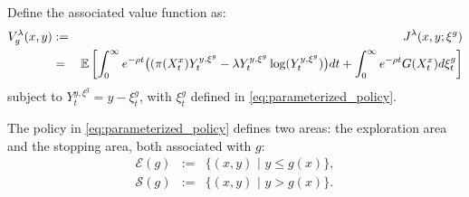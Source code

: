 \documentclass[11pt]{amsart}
\newtheorem{proposition}[theorem]{Proposition}
\theoremstyle{plain}
\def \dd{{\rm d}}
\numberwithin{equation}{section}
\begin{document}
 

Define the associated value function as: %
 \begin{eqnarray} 
      V^{\lambda}_g (x,y) &:= &J^{\lambda}(x,y;\xi^g) \nonumber \\
      &=&\mathbb{E} \left[ \int_0^{\infty}  e^{- \rho t} \big( ( \pi (X^x_{t} )Y_{t}^{y,\xi^g}-\lambda Y_{t}^{y,\xi^g} \log  (Y_{t}^{y,\xi^g} ) \big) \dd t 
+  \int_0^{\infty}  e^{- \rho t} G(X^x_t) \dd\xi_t^g \right]\label{eq:V_g}
  \end{eqnarray}
 subject to $Y^{y,\xi^g}_t = y-\xi_t^g$, with $\xi_t^g$ defined in \eqref{eq:parameterized_policy}.

The policy in \eqref{eq:parameterized_policy} defines two areas: the exploration area and the stopping area, both associated with $g$:
  \begin{eqnarray}
      \mathcal{E}(g) &:=&\Big\{(x,y)\,\,\Big|\,\, y \leq g(x) \Big\}, \\
      \mathcal{S}(g) &:=& \Big\{(x,y)\,\,\Big|\,\,   y> g(x)  \Big\}.
\end{eqnarray}
\end{document}
